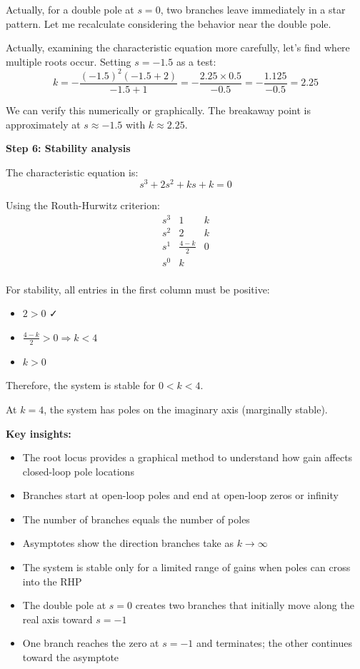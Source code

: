 \documentclass[11pt,a4paper]{article}
\begin{document}
Actually, for a double pole at $s=0$, two branches leave immediately in a star pattern. Let me recalculate considering the behavior near the double pole.

Actually, examining the characteristic equation more carefully, let's find where multiple roots occur. Setting $s = -1.5$ as a test:
\[
k = -\frac{(-1.5)^2(-1.5 + 2)}{-1.5 + 1} = -\frac{2.25 \times 0.5}{-0.5} = -\frac{1.125}{-0.5} = 2.25
\]

We can verify this numerically or graphically. The breakaway point is approximately at $s \approx -1.5$ with $k \approx 2.25$.

\textbf{Step 6: Stability analysis}

The characteristic equation is:
\[
s^3 + 2s^2 + ks + k = 0
\]

Using the Routh-Hurwitz criterion:
\[
\begin{array}{c|cc}
s^3 & 1 & k \\
s^2 & 2 & k \\
s^1 & \frac{4 - k}{2} & 0 \\
s^0 & k & \\
\end{array}
\]

For stability, all entries in the first column must be positive:
\begin{itemize}
\item $2 > 0$ ✓
\item $\frac{4 - k}{2} > 0 \Rightarrow k < 4$
\item $k > 0$
\end{itemize}

Therefore, the system is stable for $0 < k < 4$.

At $k = 4$, the system has poles on the imaginary axis (marginally stable).

\textbf{Key insights:}
\begin{itemize}
\item The root locus provides a graphical method to understand how gain affects closed-loop pole locations
\item Branches start at open-loop poles and end at open-loop zeros or infinity
\item The number of branches equals the number of poles
\item Asymptotes show the direction branches take as $k \to \infty$
\item The system is stable only for a limited range of gains when poles can cross into the RHP
\item The double pole at $s = 0$ creates two branches that initially move along the real axis toward $s = -1$
\item One branch reaches the zero at $s = -1$ and terminates; the other continues toward the asymptote
\end{itemize}
\end{document}
